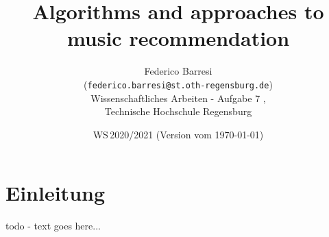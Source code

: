 \documentclass[11pt,twoside,a4paper]{article}
\begin{document}
\title{Algorithms and approaches to music recommendation}
\author{Federico Barresi \\
  (\texttt{federico.barresi@st.oth-regensburg.de})\\[5mm]
  Wissenschaftliches Arbeiten - Aufgabe 7 , \\
  Technische Hochschule Regensburg
}
  
\date{WS\,2020/2021 (Version vom \today)}

\maketitle


\section{Einleitung}
todo - text goes here...



\end{document}
